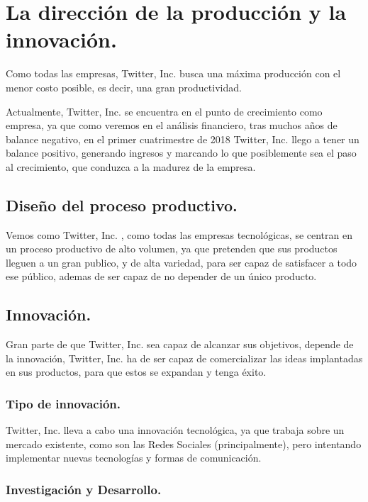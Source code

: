 
\section{La dirección de la producción y la innovación.}

Como todas las empresas, Twitter, Inc. busca una máxima producción con el menor costo posible, es decir, una gran productividad.

Actualmente, Twitter, Inc. se encuentra en el punto de crecimiento como empresa, ya que como veremos en el análisis financiero, tras muchos años de balance negativo, en el primer cuatrimestre de 2018 Twitter, Inc. llego a tener un balance positivo, generando ingresos y marcando lo que posiblemente sea el paso al crecimiento, que conduzca a la madurez de la empresa.

\subsection{Diseño del proceso productivo.}

Vemos como Twitter, Inc. , como todas las empresas tecnológicas, se centran en un proceso productivo de alto volumen, ya que pretenden que sus productos lleguen a un gran publico, y de alta variedad, para ser capaz de satisfacer a todo ese público, ademas de ser capaz de no depender de un único producto.

\subsection{Innovación.}

Gran parte de que Twitter, Inc. sea capaz de alcanzar sus objetivos, depende de la innovación, Twitter, Inc. ha de ser capaz de comercializar las ideas implantadas en sus productos, para que estos se expandan y tenga éxito.

\subsubsection{Tipo de innovación.}

Twitter, Inc. lleva a cabo una innovación tecnológica, ya que trabaja sobre un mercado existente, como son las Redes Sociales (principalmente), pero intentando implementar nuevas tecnologías y formas de comunicación.

\subsubsection{Investigación y Desarrollo.}


